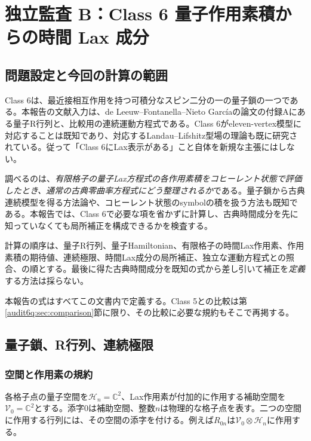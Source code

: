 \section{独立監査 B：Class 6 量子作用素積からの時間 Lax 成分}
\subsection{問題設定と今回の計算の範囲}
Class 6は、最近接相互作用を持つ可積分なスピン二分の一の量子鎖の一つである。本報告の文献入力は、de Leeuw--Fontanella--Nieto Garcíaの論文\cite{DFN}の付録Aにある量子R行列と、比較用の連続運動方程式である。Class 6がeleven-vertex模型に対応することは既知であり\cite{CdL}、対応するLandau--Lifshitz型場の理論も既に研究されている\cite{LOZ}。従って「Class 6にLax表示がある」こと自体を新規な主張にはしない。

調べるのは、\emph{有限格子の量子Lax方程式の各作用素積をコヒーレント状態で評価したとき、通常の古典零曲率方程式にどう整理されるか}である。量子鎖から古典連続模型を得る方法論\cite{ADS}や、コヒーレント状態のsymbolの積を扱う方法\cite{KS}も既知である。本報告では、Class 6で必要な項を省かずに計算し、古典時間成分を先に知っていなくても局所補正を構成できるかを検査する。

計算の順序は、量子R行列、量子Hamiltonian、有限格子の時間Lax作用素、作用素積の期待値、連続極限、時間Lax成分の局所補正、独立な運動方程式との照合、の順とする。最後に得た古典時間成分を既知の式から差し引いて補正を\emph{定義}する方法は採らない。

本報告の式はすべてこの文書内で定義する。Class 5との比較は第\ref{audit6q:sec:comparison}節に限り、その比較に必要な規約もそこで再掲する。

\subsection{量子鎖、R行列、連続極限}
\subsubsection{空間と作用素の規約}
各格子点の量子空間を$\mathcal H_n=\mathbb C^2$、Lax作用素が付加的に作用する補助空間を$\mathcal V_0=\mathbb C^2$とする。添字$0$は補助空間、整数$n$は物理的な格子点を表す。二つの空間に作用する行列には、その空間の添字を付ける。例えば$R_{0n}$は$\mathcal V_0\otimes\mathcal H_n$に作用する。

